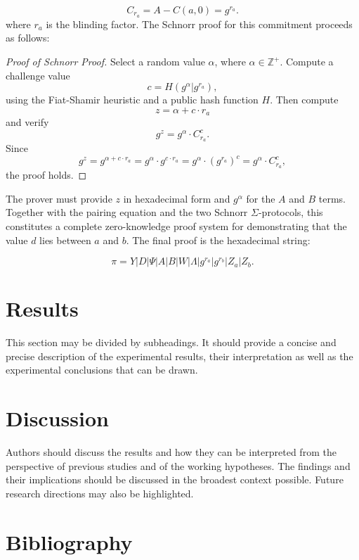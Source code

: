 \documentclass[version=preprint]{iacrcc}
\begin{document}
\begin{equation}
C_{r_a} = A - C(a, 0) = g^{r_{a}}.
\end{equation}
where \( r_{a} \) is the blinding factor. The Schnorr proof for this commitment proceeds as follows:

\begin{proof}[Proof of Schnorr Proof]
Select a random value \( \alpha \), where \( \alpha \in \mathbb{Z}^+ \). Compute a challenge value
\begin{equation}
c = H(g^{\alpha} | g^{r_{a}}), 
\end{equation}
using the Fiat-Shamir heuristic and a public hash function \( H \). Then compute 
\begin{equation}
z = \alpha + c \cdot r_{a}
\end{equation}
and verify
\begin{equation}
g^{z} = g^{\alpha} \cdot C_{r_a}^{c}.
\end{equation}
Since 
\begin{equation}
g^{z} = g^{\alpha + c \cdot r_{a}} = g^{\alpha} \cdot g^{c \cdot r_{a}} = g^{\alpha} \cdot (g^{r_{a}})^{c} = g^{\alpha} \cdot C_{r_a}^{c},
\end{equation}
the proof holds.
\end{proof}

The prover must provide \( z \) in hexadecimal form and \( g^{\alpha} \) for the \( A \) and \( B \) terms. Together with the pairing equation and the two Schnorr $\Sigma$-protocols, this constitutes a complete zero-knowledge proof system for demonstrating that the value \( d \) lies between \( a \) and \( b \). The final proof is the hexadecimal string:

\begin{equation}
\pi = Y | D | \Psi | A | B | W | \Lambda | g^{r_{a}} | g^{r_{b}} | Z_{a} | Z_{b}.
\end{equation}

\section{Results}

This section may be divided by subheadings. It should provide a concise and precise description of the experimental results, their interpretation as well as the experimental conclusions that can be drawn.


\section{Discussion}

Authors should discuss the results and how they can be interpreted from the perspective of previous studies and of the working hypotheses. The findings and their implications should be discussed in the broadest context possible. Future research directions may also be highlighted.

\section{Bibliography}

\end{document}
